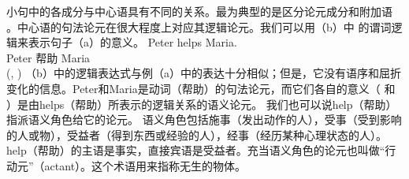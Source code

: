 小句中的各成分与中心语具有不同的关系。最为典型的是区分论元成分和附加语
。中心语的句法论元在很大程度上对应其逻辑论元。我们可以用（b）中
的谓词逻辑来表示句子（a）的意义。
\eal
\ex 
\gll Peter helps Maria.\\
     Peter 帮助 Maria\\
\ex {}(, )
\zl
（b）中的逻辑表达式与例（a）中的表达十分相似；但是，它没有语序和屈折变化的信息。Peter和Maria是动词（帮助）的句法论元，而它们各自的意义（ 和 ）是由helps（帮助）所表示的逻辑关系的语义论元。
我们也可以说help（帮助）指派语义角色给它的论元。
语义角色包括施事（发出动作的人），受事（受到影响的人或物），受益者（得到东西或经验的人），经事（经历某种心理状态的人）。help（帮助）的主语是事实，直接宾语是受益者。充当语义角色的论元也叫做“行动元”（actant）。这个术语用来指称无生的物体。

